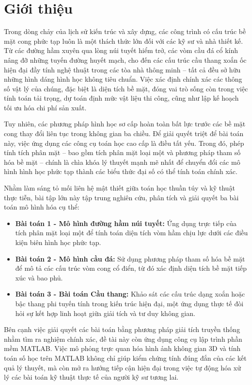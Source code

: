 \section{Giới thiệu}

Trong dòng chảy của lịch sử kiến trúc và xây dựng, các công trình có cấu trúc bề mặt cong phức tạp luôn là một thách thức lớn đối với các kỹ sư và nhà thiết kế. Từ các đường hầm xuyên qua lòng núi tuyết hiểm trở, các vòm cầu đá cổ kính nâng đỡ những tuyến đường huyết mạch, cho đến các cấu trúc cầu thang xoắn ốc hiện đại đầy tính nghệ thuật trong các tòa nhà thông minh – tất cả đều sở hữu những hình dáng hình học không tiêu chuẩn. Việc xác định chính xác các thông số vật lý của chúng, đặc biệt là diện tích bề mặt, đóng vai trò sống còn trong việc tính toán tải trọng, dự toán định mức vật liệu thi công, cũng như lập kế hoạch tối ưu hóa chi phí sản xuất.

Tuy nhiên, các phương pháp hình học sơ cấp hoàn toàn bất lực trước các bề mặt cong thay đổi liên tục trong không gian ba chiều. Để giải quyết triệt để bài toán này, việc ứng dụng các công cụ toán học cao cấp là điều tất yếu. Trong đó, phép tính tích phân mặt – bao gồm tích phân mặt loại một và phương pháp tham số hóa bề mặt – chính là chìa khóa lý thuyết mạnh mẽ nhất để chuyển đổi các mô hình hình học phức tạp thành các biểu thức đại số có thể tính toán chính xác.

Nhằm làm sáng tỏ mối liên hệ mật thiết giữa toán học thuần túy và kỹ thuật thực tiễn, bài tập lớn này tập trung nghiên cứu, phân tích và giải quyết ba bài toán mô hình hóa cụ thể:
\begin{itemize}
	\item \textbf{Bài toán 1 - Mô hình đường hầm núi tuyết:} Ứng dụng trực tiếp của tích phân mặt loại một để tính toán diện tích vòm hầm chịu lực dưới các điều kiện biên hình học phức tạp.
	\item \textbf{Bài toán 2 - Mô hình cầu đá:} Sử dụng phương pháp tham số hóa bề mặt để mô tả các cấu trúc vòm cong cổ điển, từ đó xác định diện tích bề mặt tiếp xúc và bao phủ.
	\item \textbf{Bài toán 3 - Bài toán Cầu thang:} Khảo sát các cấu trúc dạng xoắn hoặc bậc thang phi tuyến tính trong kiến trúc hiện đại, một ứng dụng thực tế đòi hỏi sự kết hợp linh hoạt giữa giải tích và tư duy không gian.
\end{itemize}

Bên cạnh việc giải quyết các bài toán bằng phương pháp giải tích truyền thống nhằm tìm ra nghiệm chính xác, đề tài này còn ứng dụng công cụ lập trình phần mềm MATLAB. Việc mô phỏng trực quan hóa hình ảnh không gian 3D và tính toán số học trên MATLAB không chỉ giúp kiểm chứng tính đúng đắn của các kết quả lý thuyết, mà còn mở ra hướng tiếp cận hiện đại trong việc tự động hóa xử lý các bài toán kỹ thuật thực tế của người kỹ sư tương lai.
\newpage
